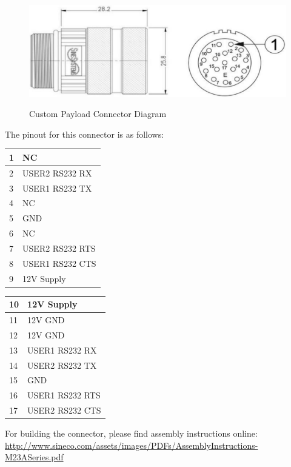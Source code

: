 \documentclass[]{clearpath-latex/clearpath-manual}
\begin{document}
\begin{figure}[h]
  \centering
  \includegraphics[width=0.75\linewidth]{kf_custompayload.PNG}
  \label{kf_custompayload}
  \caption{Custom Payload Connector Diagram}
\end{figure}

The pinout for this connector is as follows:
\bgroup
\def\arraystretch{1.5}%
\begin{table}[h]
\centering
\label{my-label}
\begin{tabular}{|l|l|} 
\hline
\rowcolor{lightgrey} 
1  & NC              \\ \hline
2  & USER2 RS232 RX  \\ \hline
3  & USER1 RS232 TX  \\ \hline
\rowcolor{lightgrey} 
4  & NC              \\ \hline
5  & GND             \\ \hline
\rowcolor{lightgrey} 
6  & NC              \\ \hline
7  & USER2 RS232 RTS \\ \hline
8  & USER1 RS232 CTS \\ \hline
9  & 12V Supply      \\ \hline
\end{tabular}
\quad
\begin{tabular}{|l|l|} 
\hline
10 & 12V Supply      \\ \hline
11 & 12V GND         \\ \hline
12 & 12V GND         \\ \hline
13 & USER1 RS232 RX  \\ \hline
14 & USER2 RS232 TX  \\ \hline
15 & GND             \\ \hline
16 & USER1 RS232 RTS \\ \hline
17 & USER2 RS232 CTS \\ \hline
\end{tabular}
\end{table}
\egroup

For building the connector, please find assembly instructions online: \url{http://www.sineco.com/assets/images/PDFs/AssemblyInstructions-M23ASeries.pdf}
\end{document}
